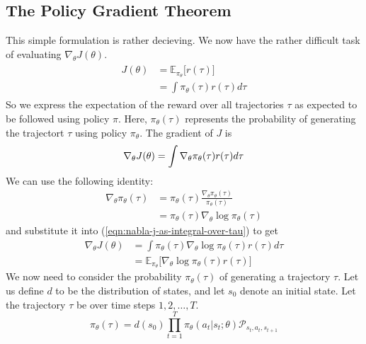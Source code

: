 \documentclass[journal, onecolumn, 12pt, draftclsnofoot]{IEEEtran}
\numberwithin{equation}{section}
\newcommand{\mc}[1]{\mathcal{#1}}
\begin{document}
		\subsection{The Policy Gradient Theorem}
		This simple formulation is rather decieving. We now have the rather difficult task of evaluating $\nabla_\theta J(\theta)$.
		\begin{align}
			\begin{split}
			\label{eqn:j-as-integral-over-tau}
			J(\theta) &= \mathbb{E}_{\pi_\theta} \big[ r(\tau) \big] \\
			&= \int \pi_\theta (\tau) r(\tau) d \tau
		\end{split}
		\end{align}
		So we express the expectation of the reward over all trajectories $\tau$ as expected to be followed using policy $\pi$. Here, $\pi_\theta (\tau)$ represents the probability of generating the trajectort $\tau$ using policy $\pi_\theta$. The gradient of $J$ is
		\begin{equation}
			\label{eqn:nabla-j-as-integral-over-tau}
			\nabla_\theta J(\theta) = \int \nabla_\theta \pi_\theta (\tau) r(\tau) d \tau \\
		\end{equation}
		We can use the following identity:
		\begin{align}
			\label{eqn:nabla_log_identity}
			\nabla_\theta \pi_\theta (\tau) &= \pi_\theta (\tau) \frac{\nabla_\theta \pi_\theta (\tau)}{\pi_\theta (\tau)} \\
			&= \pi_\theta (\tau) \nabla_\theta \log \pi_\theta (\tau)
	\end{align}
	and substitute it into (\ref{eqn:nabla-j-as-integral-over-tau}) to get
	\begin{align}
		\label{eqn:nabla-j-with-log}
		\nabla_\theta J(\theta) &= \int \pi_\theta (\tau) \nabla_\theta \log \pi_\theta (\tau) r(\tau) d \tau \\
		&= \mathbb{E}_{\pi_\theta} \big[ \nabla_\theta \log \pi_\theta (\tau) r(\tau)\big] \nonumber
	\end{align}
	We now need to consider the probability $\pi_\theta (\tau)$ of generating a trajectory $\tau$. Let us define $d$ to be the distribution of states, and let $s_0$ denote an initial state. Let the trajectory $\tau$ be over time steps $1, 2, \dots, T$.
	\begin{equation}
		\label{eqn:probability_of_generating_tau}
		\pi_\theta (\tau) = d(s_0) \prod_{t=1}^T \pi_\theta (a_t \vert s_t; \theta) \mc{P}_{s_t, a_t, s_{t+1}}
	\end{equation}
\end{document}
